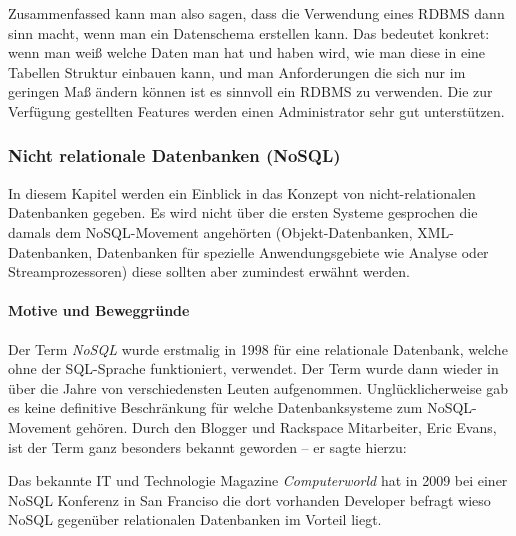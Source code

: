 Zusammenfassed kann man also sagen, dass die Verwendung eines RDBMS dann sinn macht, wenn man ein Datenschema erstellen kann. Das bedeutet konkret: wenn man weiß welche Daten man hat und haben wird, wie man diese in eine Tabellen Struktur einbauen kann, und man Anforderungen die sich nur im geringen Maß ändern können ist es sinnvoll ein RDBMS zu verwenden. Die zur Verfügung gestellten Features werden einen Administrator sehr gut unterstützen. 


\subsubsection{Nicht relationale Datenbanken (NoSQL)}
\label{subsec:nichtrelationaleDB}

In diesem Kapitel werden ein Einblick in das Konzept von nicht-relationalen Datenbanken gegeben. Es wird nicht über die ersten Systeme gesprochen die damals dem NoSQL-Movement angehörten (Objekt-Datenbanken, XML-Datenbanken, Datenbanken für spezielle Anwendungsgebiete wie Analyse oder Streamprozessoren) diese sollten aber zumindest erwähnt werden.

\paragraph{Motive und Beweggründe}
Der Term \textit{NoSQL} wurde erstmalig in 1998 für eine relationale Datenbank, welche ohne der SQL-Sprache funktioniert, verwendet\cite{MELD.CH2-noSQL.firstSQLNaming}. Der Term wurde dann wieder in über die Jahre von verschiedensten Leuten aufgenommen. Unglücklicherweise gab es keine definitive Beschränkung für welche Datenbanksysteme zum NoSQL-Movement gehören. Durch den Blogger und Rackspace Mitarbeiter, Eric Evans, ist der Term ganz besonders bekannt geworden – er sagte hierzu: \cite[\textit{“the whole point of seeking alternatives is that you need to solve a problem that relational databases are a bad fit for”}]{MELD.CH2-noSQL.whatsInAName}

Das bekannte IT und Technologie Magazine \textit{Computerworld} hat in 2009 bei einer NoSQL Konferenz in San Franciso die dort vorhanden Developer befragt wieso NoSQL gegenüber relationalen Datenbanken im Vorteil liegt\cite{MELD.CH2-noSQL.whyItsBetter}.

